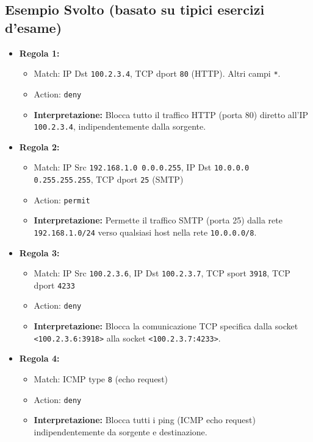 \subsection{Esempio Svolto (basato su tipici esercizi d'esame)}
\begin{itemize}
    \item \textbf{Regola 1:}
    \begin{itemize}
        \item Match: IP Dst \texttt{100.2.3.4}, TCP dport \texttt{80} (HTTP). Altri campi \texttt{*}.
        \item Action: \texttt{deny}
        \item \textbf{Interpretazione:} Blocca tutto il traffico HTTP (porta 80) diretto all'IP \texttt{100.2.3.4}, indipendentemente dalla sorgente.
    \end{itemize}

    \item \textbf{Regola 2:}
    \begin{itemize}
        \item Match: IP Src \texttt{192.168.1.0 0.0.0.255}, IP Dst \texttt{10.0.0.0 0.255.255.255}, TCP dport \texttt{25} (SMTP)
        \item Action: \texttt{permit}
        \item \textbf{Interpretazione:} Permette il traffico SMTP (porta 25) dalla rete \texttt{192.168.1.0/24} verso qualsiasi host nella rete \texttt{10.0.0.0/8}.
    \end{itemize}

    \item \textbf{Regola 3:}
    \begin{itemize}
        \item Match: IP Src \texttt{100.2.3.6}, IP Dst \texttt{100.2.3.7}, TCP sport \texttt{3918}, TCP dport \texttt{4233}
        \item Action: \texttt{deny}
        \item \textbf{Interpretazione:} Blocca la comunicazione TCP specifica dalla socket \texttt{<100.2.3.6:3918>} alla socket \texttt{<100.2.3.7:4233>}.
    \end{itemize}

    \item \textbf{Regola 4:}
    \begin{itemize}
        \item Match: ICMP type \texttt{8} (echo request)
        \item Action: \texttt{deny}
        \item \textbf{Interpretazione:} Blocca tutti i ping (ICMP echo request) indipendentemente da sorgente e destinazione.
    \end{itemize}
\end{itemize}

